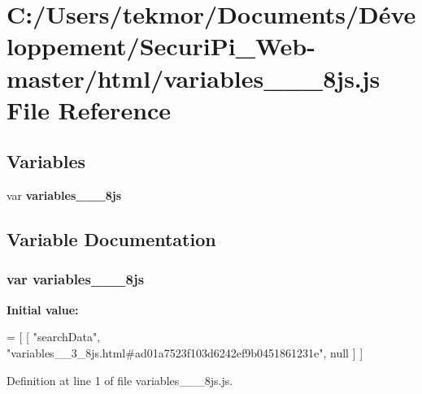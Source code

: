 \section{C\+:/\+Users/tekmor/\+Documents/\+Développement/\+Securi\+Pi\+\_\+\+Web-\/master/html/variables\+\_\+\+\_\+\_\+8js.js File Reference}
\label{variables____3__8js_8js}
\subsection*{Variables}
\begin{DoxyCompactItemize}
\item 
var {\bf variables\+\_\+\+\_\+\_\+8js}
\end{DoxyCompactItemize}


\subsection{Variable Documentation}
\subsubsection[{variables\+\_\+\+\_\+3\+\_\+8js}]{\setlength{\rightskip}{0pt plus 5cm}var variables\+\_\+\+\_\+\_\+8js}\label{variables____3__8js_8js_a83d36fef645064770b219ec822cfdd9f}
{\bfseries Initial value\+:}
\begin{DoxyCode}
=
[
    [ \textcolor{stringliteral}{"searchData"}, \textcolor{stringliteral}{"variables\_\_3\_8js.html#ad01a7523f103d6242ef9b0451861231e"}, null ]
]
\end{DoxyCode}


Definition at line 1 of file variables\+\_\+\+\_\+\_\+8js.\+js.

